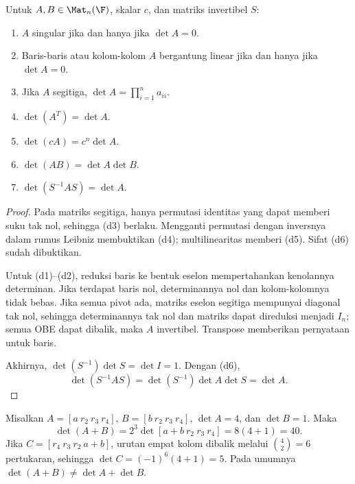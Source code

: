 \begin{prop}
      \label{det:dasar}
      Untuk $A,B\in\Mat_n(\F)$, skalar $c$, dan matriks invertibel $S$:
      \begin{enumerate}[label=(d\arabic*),nosep]
            \item $A$ singular jika dan hanya jika $\det A=0$.
            \item Baris-baris atau kolom-kolom $A$ bergantung linear jika dan
                  hanya jika $\det A=0$.
            \item Jika $A$ segitiga, $\det A=\prod_{i=1}^n a_{ii}$.
            \item $\det(A^T)=\det A$.
            \item $\det(cA)=c^n\det A$.
            \item $\det(AB)=\det A\det B$.
            \item $\det(S^{-1}AS)=\det A$.
      \end{enumerate}
\end{prop}
\begin{proof}
      Pada matriks segitiga, hanya permutasi identitas yang dapat memberi
      suku tak nol, sehingga (d3) berlaku. Mengganti permutasi dengan
      inversnya dalam rumus Leibniz membuktikan (d4); multilinearitas
      memberi (d5). Sifat (d6) sudah dibuktikan.

      Untuk (d1)--(d2), reduksi baris ke bentuk eselon mempertahankan
      kenolannya determinan. Jika terdapat baris nol, determinannya nol
      dan kolom-kolomnya tidak bebas. Jika semua pivot ada, matriks eselon
      segitiga mempunyai diagonal tak nol, sehingga determinannya tak nol
      dan matriks dapat direduksi menjadi $I_n$; semua OBE dapat dibalik,
      maka $A$ invertibel. Transpose memberikan pernyataan untuk baris.

      Akhirnya, $\det(S^{-1})\det S=\det I=1$. Dengan (d6),
      \[
            \det(S^{-1}AS)=\det(S^{-1})\det A\det S=\det A.
      \]
\end{proof}

\begin{exam}
      Misalkan $A=[a\ r_2\ r_3\ r_4]$, $B=[b\ r_2\ r_3\ r_4]$,
      $\det A=4$, dan $\det B=1$. Maka
      \[
            \det(A+B)=2^3\det[a+b\ r_2\ r_3\ r_4]=8(4+1)=40.
      \]
      Jika $C=[r_4\ r_3\ r_2\ a+b]$, urutan empat kolom dibalik melalui
      $\binom42=6$ pertukaran, sehingga $\det C=(-1)^6(4+1)=5$.
      Pada umumnya $\det(A+B)\ne\det A+\det B$.
\end{exam}

